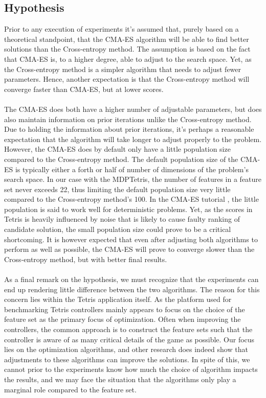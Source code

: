 \subsection{Hypothesis}

Prior to any execution of experiments it's assumed that, purely based 
on a theoretical standpoint, that the CMA-ES algorithm will be able to 
find better solutions than the Cross-entropy method. The assumption is based 
on the fact that CMA-ES is, to a higher degree, able to adjust to the 
search space. Yet, as the Cross-entropy method is a simpler algorithm that needs 
to adjust fewer parameters. Hence, another expectation is that the Cross-entropy
method will converge faster than CMA-ES, but at lower scores.\\
\\
The CMA-ES does both have a higher number of adjustable parameters, but does also
maintain information on prior iterations unlike the Cross-entropy method.
Due to holding the information about prior iterations, it's perhaps a reasonable
expectation that the algorithm will take longer to adjust properly to the
problem. However, the CMA-ES does by default only have a little population size 
compared to the Cross-entropy method. The default population size of the CMA-ES is
typically either a forth or half of number of dimensions of the problem's search space.
In our case with the MDPTetris, the number of features in a feature set never exceeds
22, thus limiting the default population size very little compared to the Cross-entropy method's 
100. In the CMA-ES tutorial \citep{hansen2011}, the little population is said to
work well for deterministic problems. Yet, as the scores in Tetris is heavily
influenced by noise that is likely to cause faulty ranking of candidate solution,
the small population size could prove to be a critical shortcoming.
It is however expected that even after adjusting both algorithms to perform as 
well as possible, the CMA-ES will prove to converge slower than the Cross-entropy method, but
with better final results.\\
\\
As a final remark on the hypothesis, we must recognize that the experiments can 
end up rendering little difference between the two algorithms. The reason for 
this concern lies within the Tetris application itself. As the platform used for benchmarking 
Tetris controllers mainly appears to focus on the choice of the feature set as the primary
focus of optimization. Often when improving the controllers, the common approach is to
construct the feature sets such that the controller is aware of as many critical 
details of the game as possible. Our focus lies on the optimization algorithms,
and other research does indeed show that adjustments to these algorithms can 
improve the solutions. In spite of this, we cannot prior to the experiments know how much
the choice of algorithm impacts the results, and we may face the situation that 
the algorithms only play a marginal role compared to the feature set.
